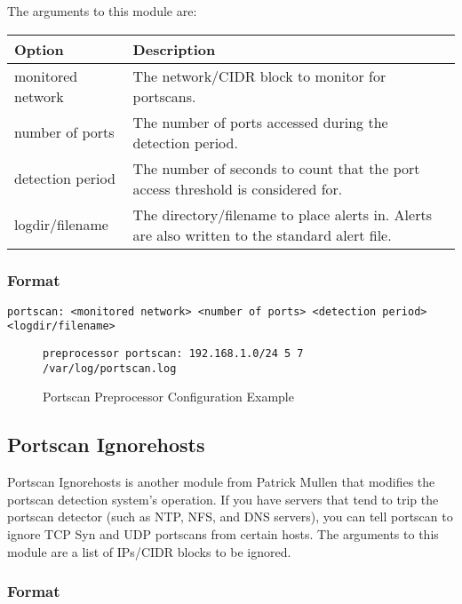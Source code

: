 \documentclass[english]{report}
\begin{document}
The arguments to this module are:
 
\begin{tabular}{| l | p{5in} |}
\hline
{\bf Option} & {\bf Description}\\
\hline
\hline
monitored network & The network/CIDR block to monitor for portscans.\\
\hline
number of ports & The number of ports accessed during the detection period.\\
\hline
detection period & The number of seconds to count that the port access threshold
is considered for. \\
\hline
logdir/filename & The directory/filename to place alerts in. Alerts
are also written to the standard alert file.\\
\hline
\end{tabular}

\subsubsection{Format}

\begin{verbatim}
portscan: <monitored network> <number of ports> <detection period> <logdir/filename>
\end{verbatim}
%
\begin{figure}[!hbpt]
\begin{verbatim}
preprocessor portscan: 192.168.1.0/24 5 7 /var/log/portscan.log
\end{verbatim}

\caption{\label{Portscan Processor Config}Portscan Preprocessor Configuration
Example}
\end{figure}



\subsection{Portscan Ignorehosts}

Portscan Ignorehosts is another module from Patrick Mullen that modifies the 
portscan detection system's operation. If you have servers that tend to trip the
portscan detector (such as NTP, NFS, and DNS servers), you can tell
portscan to ignore TCP Syn and UDP portscans from certain hosts. The
arguments to this module are a list of IPs/CIDR blocks to be ignored.


\subsubsection{Format}
\end{document}
